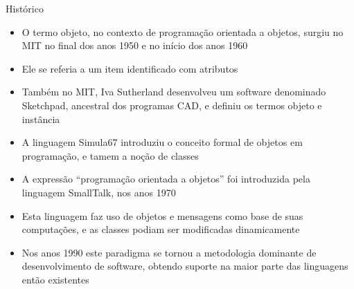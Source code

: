 \begin{frame}[fragile]{Histórico}

    \begin{itemize}
        \item O termo objeto, no contexto de programação orientada a objetos, surgiu no MIT no
            final dos anos 1950 e no início dos anos 1960

        \item Ele se referia a um item identificado com atributos

        \item Também no MIT, Iva Sutherland desenvolveu um software denominado Sketchpad, ancestral
            dos programas CAD, e definiu os termos objeto e instância

        \item A linguagem Simula67 introduziu o conceito formal de objetos em programação, e tamem
            a noção de classes

        \item A expressão ``programação orientada a objetos'' foi introduzida pela linguagem 
            SmallTalk, nos anos 1970

        \item Esta linguagem faz uso de objetos e mensagens como base de suas computações, e as
            classes podiam ser modificadas dinamicamente

        \item Nos anos 1990 este paradigma se tornou a metodologia dominante de desenvolvimento 
            de software, obtendo suporte na maior parte das linguagens então existentes
    \end{itemize}

\end{frame}

